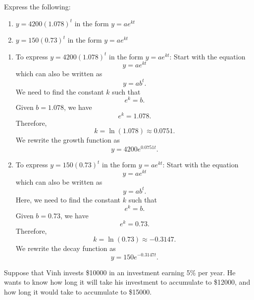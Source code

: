 \begin{example}
    Express the following:
    \begin{enumerate}
        \item \( y = 4200 (1.078)^t \) in the form \( y = ae^{kt} \)
        \item \( y = 150 (0.73)^t \) in the form \( y = ae^{kt} \)
    \end{enumerate}
\end{example}

\begin{solution}
    \begin{enumerate}
        \item To express \( y = 4200 (1.078)^t \) in the form \( y = ae^{kt} \):
              Start with the equation \[ y = ae^{kt} \] which can also be written as \[ y = ab^t. \] We need to find the constant \( k \) such that \[ e^k = b. \] Given \( b = 1.078 \), we have \[ e^k = 1.078. \] Therefore, \[ k = \ln(1.078) \approx 0.0751. \] We rewrite the growth function as \[ y = 4200 e^{0.0751t}. \]

        \item To express \( y = 150 (0.73)^t \) in the form \( y = ae^{kt} \):
              Start with the equation \[ y = ae^{kt} \] which can also be written as \[ y = ab^t. \] Here, we need to find the constant \( k \) such that \[ e^k = b. \] Given \( b = 0.73 \), we have \[ e^k = 0.73. \] Therefore, \[ k = \ln(0.73) \approx -0.3147. \] We rewrite the decay function as \[ y = 150 e^{-0.3147t}. \]
    \end{enumerate}
\end{solution}

\begin{example}
    Suppose that Vinh invests \$10000 in an investment earning 5\% per year. He wants to know how long it will take his investment to accumulate to \$12000, and how long it would take to accumulate to \$15000.
\end{example}

